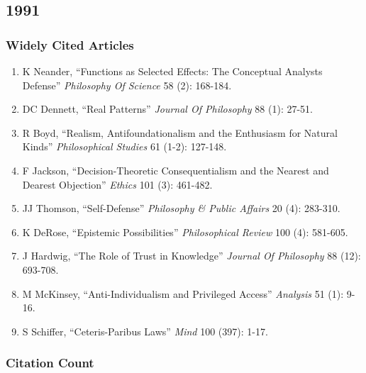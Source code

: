 \documentclass[
  10pt,
  letterpaper,
  DIV=11,
  numbers=noendperiod,
  twoside]{scrartcl}
\providecommand{\tightlist}{%
  \setlength{\itemsep}{0pt}\setlength{\parskip}{0pt}}\usepackage{longtable,booktabs,array}
\begin{document}
\newpage

\subsection{1991}\label{section-15}

\subsubsection*{Widely Cited Articles}\label{widely-cited-articles-15}

\begin{enumerate}
\def\labelenumi{\arabic{enumi}.}
\tightlist
\item
  K Neander, ``Functions as Selected Effects: The Conceptual Analysts
  Defense'' \emph{Philosophy Of Science} 58 (2): 168-184.
\item
  DC Dennett, ``Real Patterns'' \emph{Journal Of Philosophy} 88 (1):
  27-51.
\item
  R Boyd, ``Realism, Antifoundationalism and the Enthusiasm for Natural
  Kinds'' \emph{Philosophical Studies} 61 (1-2): 127-148.
\item
  F Jackson, ``Decision-Theoretic Consequentialism and the Nearest and
  Dearest Objection'' \emph{Ethics} 101 (3): 461-482.
\item
  JJ Thomson, ``Self-Defense'' \emph{Philosophy \& Public Affairs} 20
  (4): 283-310.
\item
  K DeRose, ``Epistemic Possibilities'' \emph{Philosophical Review} 100
  (4): 581-605.
\item
  J Hardwig, ``The Role of Trust in Knowledge'' \emph{Journal Of
  Philosophy} 88 (12): 693-708.
\item
  M McKinsey, ``Anti-Individualism and Privileged Access''
  \emph{Analysis} 51 (1): 9-16.
\item
  S Schiffer, ``Ceteris-Paribus Laws'' \emph{Mind} 100 (397): 1-17.
\end{enumerate}

\subsubsection*{Citation Count}\label{citation-count-15}
\end{document}
